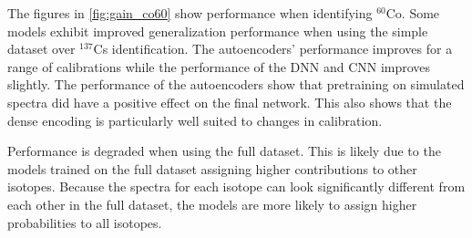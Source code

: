 The figures in \ref{fig:gain_co60} show performance when identifying $^{60}$Co. Some models exhibit improved generalization performance when using the simple dataset over $^{137}$Cs identification. The autoencoders' performance improves for a range of calibrations while the performance of the DNN and CNN improves slightly. The performance of the autoencoders show that pretraining on simulated spectra did have a positive effect on the final network. This also shows that the dense encoding is particularly well suited to changes in calibration.

Performance is degraded when using the full dataset. This is likely due to the models trained on the full dataset assigning higher contributions to other isotopes. Because the spectra for each isotope can look significantly different from each other in the full dataset, the models are more likely to assign higher probabilities to all isotopes.


